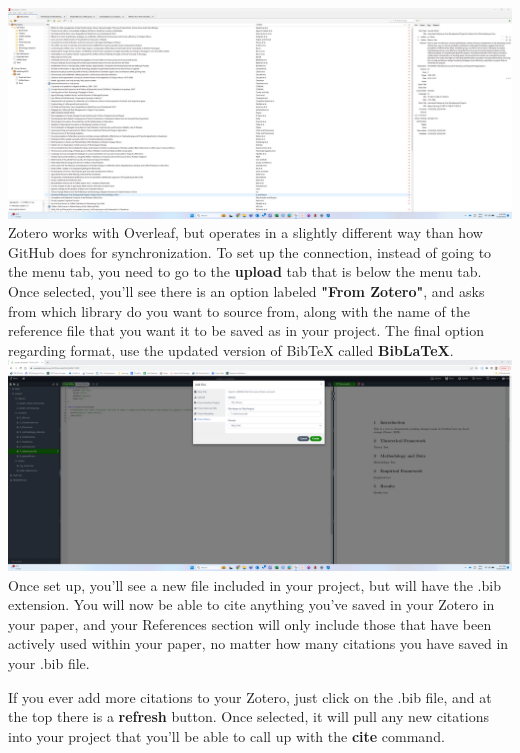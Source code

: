 \documentclass[12pt]{article}
\begin{document}
\includegraphics[width=1\textwidth]{Instructions/project_template_screenshots/project_template_35.png} \\

Zotero works with Overleaf, but operates in a slightly different way than how GitHub does for synchronization. To set up the connection, instead of going to the menu tab, you need to go to the \textbf{upload} tab that is below the menu tab. Once selected, you'll see there is an option labeled \textbf{"From Zotero"}, and asks from which library do you want to source from, along with the name of the reference file that you want it to be saved as in your project. The final option regarding format, use the updated version of BibTeX called \textbf{BibLaTeX}. \\

\includegraphics[width=1\textwidth]{Instructions/project_template_screenshots/project_template_34.png} \\

Once set up, you'll see a new file included in your project, but will have the .bib extension. You will now be able to cite anything you've saved in your Zotero in your paper, and your References section will only include those that have been actively used within your paper, no matter how many citations you have saved in your .bib file. 

If you ever add more citations to your Zotero, just click on the .bib file, and at the top there is a \textbf{refresh} button. Once selected, it will pull any new citations into your project that you'll be able to call up with the \textbf{cite} command. \\
\end{document}
